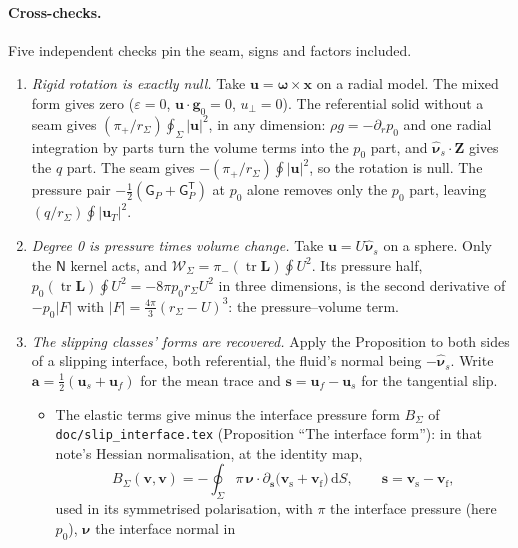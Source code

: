 \documentclass[11pt]{article}
\theoremstyle{definition}
\theoremstyle{remark}
\newcommand{\bu}{\mathbf{u}}
\newcommand{\bv}{\mathbf{v}}
\newcommand{\bx}{\mathbf{x}}
\newcommand{\bomega}{\boldsymbol{\omega}}
\newcommand{\dS}{\,\mathrm{d}S}
\newcommand{\code}[1]{\texttt{#1}}
\newcommand{\nuhs}{\hat{\boldsymbol{\nu}}_s}
\begin{document}
\paragraph{Cross-checks.} Five independent checks pin the seam, signs
and factors included.
\begin{enumerate}
\item \emph{Rigid rotation is exactly null.} Take $\bu = \bomega\times
  \bx$ on a radial model. The mixed form gives zero ($\varepsilon = 0$,
  $\bu\cdot\mathbf g_0 = 0$, $u_\perp = 0$). The referential solid without
  a seam gives $(\pi_+/r_\Sigma)\oint_\Sigma|\bu|^2$, in any dimension:
  $\rho g = -\partial_rp_0$ and one radial integration by parts turn
  the volume terms into the $p_0$ part, and $\nuhs\cdot\mathbf Z$
  gives the $q$ part. The seam gives $-(\pi_+/r_\Sigma)\oint|\bu|^2$,
  so the rotation is null. The pressure pair $-\tfrac12(\mathsf G_P +
  \mathsf G_P^{\mathsf T})$ at $p_0$ alone removes only the $p_0$ part,
  leaving $(q/r_\Sigma)\oint|\bu_T|^2$.
\item \emph{Degree 0 is pressure times volume change.} Take $\bu =
  U\nuhs$ on a sphere. Only the $\mathsf N$ kernel acts, and
  $\mathcal W_\Sigma = \pi_-(\operatorname{tr}\mathbf L)\oint U^2$. Its
  pressure half, $p_0(\operatorname{tr}\mathbf L)\oint U^2 = -8\pi p_0
  r_\Sigma U^2$ in three dimensions, is the second derivative of
  $-p_0|F|$ with $|F| = \tfrac{4\pi}{3}(r_\Sigma - U)^3$: the
  pressure--volume term.
\item \emph{The slipping classes' forms are recovered.} Apply the
  Proposition to both sides of a slipping interface, both referential,
  the fluid's normal being $-\nuhs$. Write $\mathbf a =
  \tfrac12(\bu_s + \bu_f)$ for the mean trace and $\mathbf s = \bu_f -
  \bu_s$ for the tangential slip.
  \begin{itemize}
  \item The elastic terms give minus the interface pressure form
    $B_\Sigma$ of \code{doc/slip\_interface.tex} (Proposition ``The
    interface form''): in that note's Hessian normalisation, at the
    identity map,
    \begin{equation*}
      B_\Sigma(\bv, \bv)
      = -\oint_\Sigma \pi\,\boldsymbol\nu\cdot\partial_{\mathbf s}
        \bigl(\bv_{\mathrm s} + \bv_{\mathrm f}\bigr)\dS ,
      \qquad \mathbf s = \bv_{\mathrm s} - \bv_{\mathrm f} ,
    \end{equation*}
    used in its symmetrised polarisation, with $\pi$ the interface
    pressure (here $p_0$), $\boldsymbol\nu$ the interface normal in

\end{itemize}
\end{enumerate}
\end{document}
